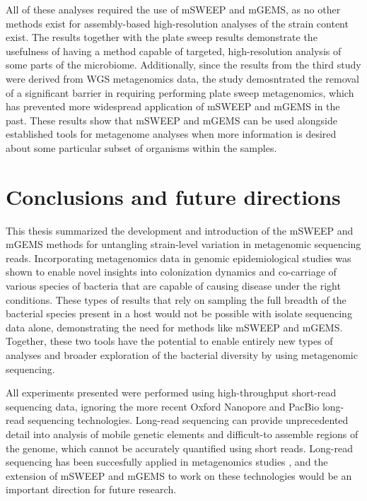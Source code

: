 \documentclass[officiallayout]{tktla}
\begin{document}
All of these analyses required the use of mSWEEP and mGEMS, as no
other methods exist for assembly-based high-resolution analyses of the
strain content exist. The results together with the plate sweep
results demonstrate the usefulness of having a method capable of
targeted, high-resolution analysis of some parts of the
microbiome. Additionally, since the results from the third study were
derived from WGS metagenomics data, the study demosntrated the removal
of a significant barrier in requiring performing plate sweep
metagenomics, which has prevented more widespread application of
mSWEEP and mGEMS in the past. These results show that mSWEEP and mGEMS
can be used alongside established tools for metagenome analyses when more
information is desired about some particular subset of organisms
within the samples.

\chapter{Conclusions and future directions}
\label{conclusions-and-future-directions}

This thesis summarized the development and introduction of the mSWEEP
and mGEMS methods for untangling strain-level variation in metagenomic
sequencing reads. Incorporating metagenomics data in genomic
epidemiological studies was shown to enable novel insights into
colonization dynamics and co-carriage of various species of bacteria
that are capable of causing disease under the right conditions. These
types of results that rely on sampling the full breadth of the
bacterial species present in a host would not be possible with isolate
sequencing data alone, demonstrating the need for methods like mSWEEP
and mGEMS. Together, these two tools have the potential to enable
entirely new types of analyses and broader exploration of the
bacterial diversity by using metagenomic sequencing.

All experiments presented were performed using high-throughput
short-read sequencing data, ignoring the more recent Oxford Nanopore
and PacBio long-read sequencing technologies. Long-read sequencing can
provide unprecedented detail into analysis of mobile genetic elements
and difficult-to assemble regions of the genome, which cannot be
accurately quantified using short reads. Long-read sequencing has been
succesfully applied in metagenomics studies \citep{somerville2019long,
  stewart2019compendium}, and the extension of mSWEEP and mGEMS to
work on these technologies would be an important direction for future
research.
\end{document}
